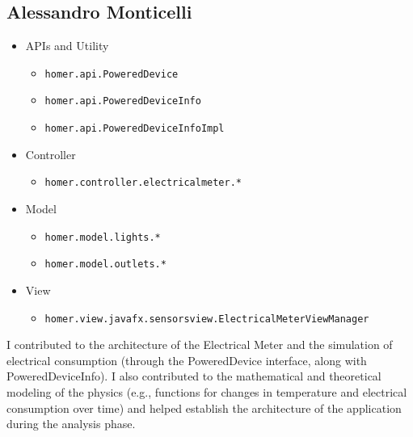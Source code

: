 \subsection{Alessandro Monticelli}

\begin{itemize}
    \item APIs and Utility
    \begin{itemize}
        \item \texttt{homer.api.PoweredDevice}
        \item \texttt{homer.api.PoweredDeviceInfo}
        \item \texttt{homer.api.PoweredDeviceInfoImpl}
    \end{itemize}
    \item Controller
    \begin{itemize}
        \item \texttt{homer.controller.electricalmeter.*}
    \end{itemize}
    \item Model
    \begin{itemize}
        \item \texttt{homer.model.lights.*}
        \item \texttt{homer.model.outlets.*}
    \end{itemize}
    \item View
    \begin{itemize}
        \item \texttt{homer.view.javafx.sensorsview.ElectricalMeterViewManager}
    \end{itemize}
\end{itemize}

I contributed to the architecture of the Electrical Meter and the simulation of electrical consumption 
(through the PoweredDevice interface, along with PoweredDeviceInfo). \newline
I also contributed to the mathematical and theoretical modeling of the physics 
(e.g., functions for changes in temperature and electrical consumption over time) 
and helped establish the architecture of the application during the analysis phase.

